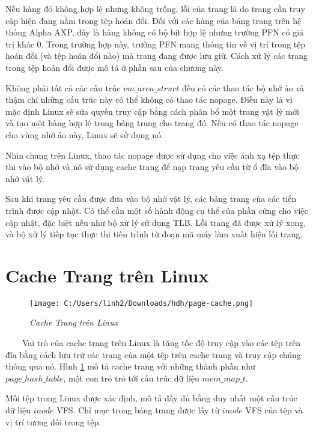 \documentclass{article}
\begin{document}
Nếu hàng đó không hợp lệ nhưng không trống, lỗi của trang là do trang cần truy cập hiện đang nằm trong tệp hoán đổi. Đối với các hàng của bảng trang trên hệ thống Alpha AXP, đây là hàng không có bộ bit hợp lệ nhưng trường PFN có giá trị khác 0. Trong trường hợp này, trường PFN mang thông tin về vị trí trong tệp hoán đổi (và tệp hoán đổi nào) mà trang đang được lưu giữ. Cách xử lý các trang trong tệp hoán đổi được mô tả ở phần sau của chương này.\vspace{1em}

Không phải tất cả các cấu trúc $vm\_area\_struct$ đều có các thao tác bộ nhớ ảo và thậm chí những cấu trúc này có thể không có thao tác nopage. Điều này là vì mặc định Linux sẽ sửa quyền truy cập bằng cách phân bổ một trang vật lý mới và tạo một hàng hợp lệ trong bảng trang cho trang đó. Nếu có thao tác nopage cho vùng nhớ ảo này, Linux sẽ sử dụng nó.\vspace{1em}

Nhìn chung trên Linux, thao tác nopage được sử dụng cho việc ánh xạ tệp thực thi vào bộ nhớ và nó sử dụng cache trang để nạp trang yêu cầu từ ổ đĩa vào bộ nhớ vật lý.\vspace{1em}

Sau khi trang yêu cầu được đưa vào bộ nhớ vật lý, các bảng trang của các tiến trình được cập nhật. Có thể cần một số hành động cụ thể của phần cứng cho việc cập nhật, đặc biệt nếu như bộ xử lý sử dụng TLB. Lỗi trang đã được xử lý xong, và bộ xử lý tiếp tục thực thi tiến trình từ đoạn mã máy làm xuất hiện lỗi trang.

\section{Cache Trang trên Linux}

\begin{figure}[H]
  \centering
  \texttt{[image: C:/Users/linh2/Downloads/hdh/page-cache.png]}
  \caption{\textit{Cache Trang trên Linux}}
  \label{fig:pagecache}
\end{figure}

~~~~Vai trò của cache trang trên Linux là tăng tốc độ truy cập vào các tệp trên đĩa bằng cách lưu trữ các trang của một tệp trên cache trang và truy cập chúng thông qua nó. Hình \ref{fig:pagecache} mô tả cache trang với những thành phần như $page\_hash\_table$, một con trỏ trỏ tới cấu trúc dữ liệu $mem\_map\_t$.\vspace{1em}

Mỗi tệp trong Linux được xác định, mô tả đầy đủ bằng duy nhất một cấu trúc dữ liệu $inode$ VFS. Chỉ mục trong bảng trang được lấy từ $inode$ VFS của tệp và vị trí tương đối trong tệp.\vspace{1em}
\end{document}
